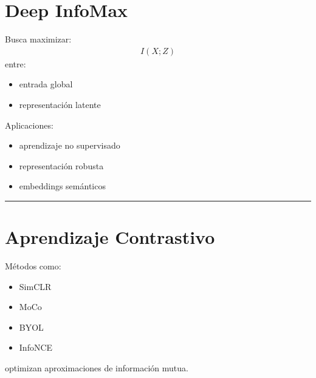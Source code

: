 \documentclass[letterpaper,10pt,english]{jupyterBook}
\begin{document}
\section{Deep InfoMax}
\label{\detokenize{04_data_science_applications/deep_learning_mi:deep-infomax}}
\sphinxAtStartPar
Busca maximizar:
\begin{equation*}
\begin{split}
I(X;Z)
\end{split}
\end{equation*}
\sphinxAtStartPar
entre:
\begin{itemize}
\item {} 
\sphinxAtStartPar
entrada global

\item {} 
\sphinxAtStartPar
representación latente

\end{itemize}

\sphinxAtStartPar
Aplicaciones:
\begin{itemize}
\item {} 
\sphinxAtStartPar
aprendizaje no supervisado

\item {} 
\sphinxAtStartPar
representación robusta

\item {} 
\sphinxAtStartPar
embeddings semánticos

\end{itemize}


\bigskip\hrule\bigskip



\section{Aprendizaje Contrastivo}
\label{\detokenize{04_data_science_applications/deep_learning_mi:aprendizaje-contrastivo}}
\sphinxAtStartPar
Métodos como:
\begin{itemize}
\item {} 
\sphinxAtStartPar
SimCLR

\item {} 
\sphinxAtStartPar
MoCo

\item {} 
\sphinxAtStartPar
BYOL

\item {} 
\sphinxAtStartPar
InfoNCE

\end{itemize}

\sphinxAtStartPar
optimizan aproximaciones de información mutua.
\end{document}

